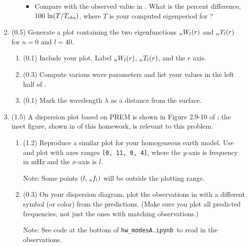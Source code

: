 \documentclass[11pt,titlepage,fleqn]{article}
\newcommand{\tfilemain}{{\tt hw\_modesA.ipynb}}
\begin{document}
\begin{enumerate}
\begin{enumerate}
\begin{itemize}
\item Compare with the observed value in . What is the percent difference, $100\,\ln(T/T_{\rm obs})$, where $T$ is your computed eigenperiod for ?
\end{itemize}

\end{enumerate}

\label{prob:l29}


\item (0.5) Generate a plot containing the two eigenfunctions $\mbox{${}_nW_l$}(r)$ and $\mbox{${}_nT_l$}(r)$ for $n=0$ and $l=40$.
%
\begin{enumerate}
\item (0.1) Include your plot. Label $\mbox{${}_nW_l$}(r)$, $\mbox{${}_nT_l$}(r)$, and the $r$ axis.
\item (0.3) Compute various wave parameters and list your values in the left half of .
\item (0.1) Mark the wavelength $\lambda$ as a distance from the surface.
\end{enumerate}

\label{prob:0T40_homo}


\item (1.5) A dispersion plot based on PREM is shown in Figure 2.9-10 of \citet{SteinWysession}; the inset figure, shown in  of this homework, is relevant to this problem. 
%
\begin{enumerate}
\item (1.2) Reproduce a similar plot for your homogeneous earth model. Use  and plot with axes ranges \verb+[0, 11, 0, 4]+, where the $y$-axis is frequency in mHz and the $x$-axis is $l$.

Note: Some points $(l,\,\mbox{${}_{n\hspace{-0.2 mm}}f_l$})$ will be outside the plotting range.

\item (0.3) On your dispersion diagram, plot the observations in  with a different symbol (or color) from the predictions. (Make sure you plot all predicted frequencies, not just the ones with matching observations.)

Note: See code at the bottom of \tfilemain\ to read in the observations.

\end{enumerate}

\label{prob:disp}



\end{enumerate}
\end{document}
